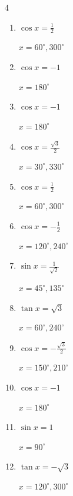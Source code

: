 \begin{multicols}{4}
\begin{enumerate}
        $\displaystyle x = 120^{\circ} , 240^{\circ}$

  \item $\displaystyle \cos{x}  = \frac{1}{2}$

        $\displaystyle x = 60^{\circ} , 300^{\circ}$

  \item $\displaystyle \cos{x}  = -1$

        $\displaystyle x = 180^{\circ}$

  \item $\displaystyle \cos{x}  = -1$

        $\displaystyle x = 180^{\circ}$

  \item $\displaystyle \cos{x}  = \frac{\sqrt{3}}{2}$

        $\displaystyle x = 30^{\circ} , 330^{\circ}$

  \item $\displaystyle \cos{x}  = \frac{1}{2}$

        $\displaystyle x = 60^{\circ} , 300^{\circ}$

  \item $\displaystyle \cos{x}  = -\frac{1}{2}$

        $\displaystyle x = 120^{\circ} , 240^{\circ}$

  \item $\displaystyle \sin{x}  = \frac{1}{\sqrt{2}}$

        $\displaystyle x = 45^{\circ} , 135^{\circ}$

  \item $\displaystyle \tan{x}  = \sqrt{3}$

        $\displaystyle x = 60^{\circ} , 240^{\circ}$

  \item $\displaystyle \cos{x}  = -\frac{\sqrt{3}}{2}$

        $\displaystyle x = 150^{\circ} , 210^{\circ}$

  \item $\displaystyle \cos{x}  = -1$

        $\displaystyle x = 180^{\circ}$

  \item $\displaystyle \sin{x}  = 1$

        $\displaystyle x = 90^{\circ}$

  \item $\displaystyle \tan{x}  = -\sqrt{3}$

        $\displaystyle x = 120^{\circ} , 300^{\circ}$


\end{enumerate}
\end{multicols}
